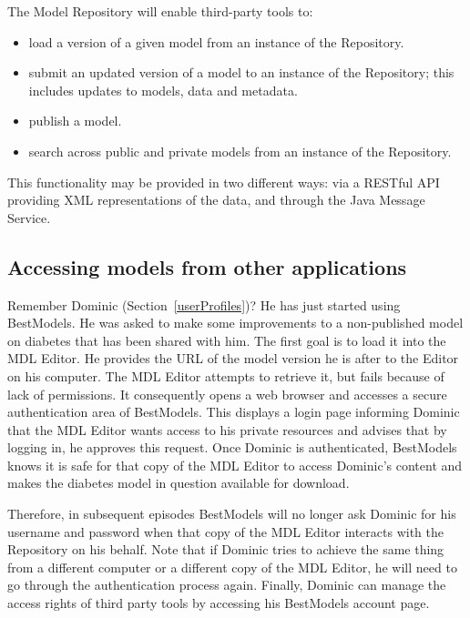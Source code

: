 The \ddmore Model Repository will enable third-party tools to:
\begin{itemize}
\item load a version of a given model from an instance of the Repository.
\item submit an updated version of a model to an instance of the Repository; this includes updates to models, data and metadata. 
\item publish a model.
\item search across public and private models from an instance of the Repository.
\end{itemize}

\begin{techNote}
This functionality may be provided in two different ways: via a RESTful API providing XML representations of the data, and through the Java Message Service. 
\end{techNote}


\subsection{Accessing models from other applications}
\label{remoteAuth}
Remember Dominic (Section~\ref{userProfiles})? He has just started using BestModels. He was asked to make some improvements to a non-published model on diabetes that has been shared with him. The first goal is to load it into the MDL Editor. He provides the URL of the model version he is after to the Editor on his computer. The MDL Editor attempts to retrieve it, but fails because of lack of permissions. It consequently opens a web browser and accesses a secure authentication area of BestModels. This displays a login page informing Dominic that the MDL Editor wants access to his private resources and advises that by logging in, he approves this request. Once Dominic is authenticated, BestModels knows it is safe for that copy of the MDL Editor to access Dominic's content and makes the diabetes model in question available for download. 

Therefore, in subsequent episodes BestModels will no longer ask Dominic for his username and password when that copy of the MDL Editor interacts with the Repository on his behalf. Note that if Dominic tries to achieve the same thing from a different computer or a different copy of the MDL Editor, he will need to go through the authentication process again. Finally, Dominic can manage the access rights of third party tools by accessing his BestModels account page. 

